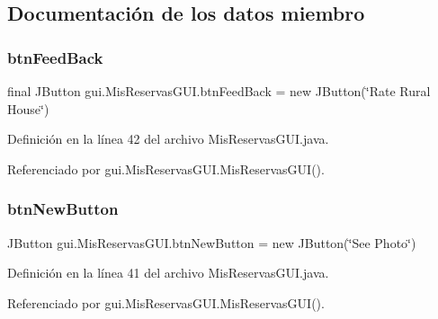 \subsection{Documentación de los datos miembro}
\mbox{\label{classgui_1_1_mis_reservas_g_u_i_a3a80cd8bcb066f875ff9e71e462924b8}} 
\subsubsection{\texorpdfstring{btnFeedBack}{btnFeedBack}}
{\footnotesize\ttfamily final J\+Button gui.\+Mis\+Reservas\+G\+U\+I.\+btn\+Feed\+Back = new J\+Button(\char`\"{}Rate Rural House\char`\"{})\hspace{0.3cm}{\ttfamily [private]}}



Definición en la línea 42 del archivo Mis\+Reservas\+G\+U\+I.\+java.



Referenciado por gui.\+Mis\+Reservas\+G\+U\+I.\+Mis\+Reservas\+G\+U\+I().

\mbox{\label{classgui_1_1_mis_reservas_g_u_i_a2333042f2b3811fec9fd968b8fd033ba}} 
\subsubsection{\texorpdfstring{btnNewButton}{btnNewButton}}
{\footnotesize\ttfamily J\+Button gui.\+Mis\+Reservas\+G\+U\+I.\+btn\+New\+Button = new J\+Button(\char`\"{}See Photo\char`\"{})\hspace{0.3cm}{\ttfamily [private]}}



Definición en la línea 41 del archivo Mis\+Reservas\+G\+U\+I.\+java.



Referenciado por gui.\+Mis\+Reservas\+G\+U\+I.\+Mis\+Reservas\+G\+U\+I().

\mbox{\label{classgui_1_1_mis_reservas_g_u_i_a99d808ceec76346293264ea1a539c3aa}} 
